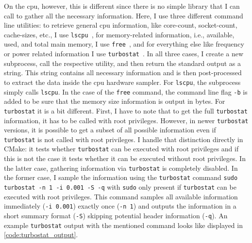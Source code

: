 On the \gls{cpu}, however, this is different since there is no simple library that I can call to gather all the necessary information. 
Here, I use three different command line utilities: to retrieve general \gls{cpu} information, like core-count, socket-count, cache-sizes, etc., I use \texttt{lscpu}~\cite{qian_lscpu_nodate}, for memory-related information, i.e., available, used, and total main memory, I use \texttt{free}~\cite{small_free_nodate}, and for everything else like frequency or power related information I use \texttt{turbostat}~\cite{brown_turbostat_nodate}. 
In all three cases, I create a new subprocess, call the respective utility, and then return the standard output as a string. 
This string contains all necessary information and is then post-processed to extract the data inside the \gls{cpu} hardware sampler. 
For \texttt{lscpu}, the subprocess simply calls \texttt{lscpu}. 
In the case of the \texttt{free} command, the command line flag \texttt{-b} is added to be sure that the memory size information is output in bytes. 
For \texttt{turbostat} it is a bit different. 
First, I have to note that to get the full \texttt{turbostat} information, it has to be called with root privileges. 
However, in newer \texttt{turbostat} versions, it is possible to get a subset of all possible information even if \texttt{turbostat} is not called with root privileges. 
I handle that distinction directly in CMake: it tests whether \texttt{turbostat} can be executed with root privileges and if this is not the case it tests whether it can be executed without root privileges. 
In the latter case, gathering information via \texttt{turbostat} is completely disabled. 
In the former case, I sample the information using the \texttt{turbostat} command \texttt{sudo turbostat -n 1 -i 0.001 -S -q} with \texttt{sudo} only present if \texttt{turbostat} can be executed with root privileges. 
This command samples all available information immediately (\texttt{-i 0.001}) exactly once (\texttt{-n 1}) and outputs the information in a short summary format (\texttt{-S}) skipping potential header information (\texttt{-q}). 
An example \texttt{turbostat} output with the mentioned command looks like displayed in \autoref{code:turbostat_output}. 

